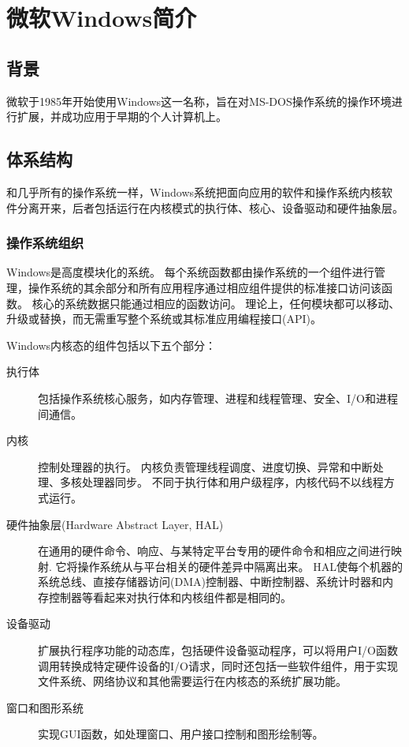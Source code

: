 
\section{微软Windows简介}
{
    \subsection{背景}
    {
        微软于1985年开始使用Windows这一名称，旨在对MS-DOS操作系统的操作环境进行扩展，并成功应用于早期的个人计算机上。
    }

    \subsection{体系结构}
    {
        和几乎所有的操作系统一样，Windows系统把面向应用的软件和操作系统内核软件分离开来，后者包括运行在内核模式的执行体、核心、设备驱动和硬件抽象层。

        \subsubsection{操作系统组织}
        {
            Windows是高度模块化的系统。
            每个系统函数都由操作系统的一个组件进行管理，操作系统的其余部分和所有应用程序通过相应组件提供的标准接口访问该函数。
            核心的系统数据只能通过相应的函数访问。
            理论上，任何模块都可以移动、升级或替换，而无需重写整个系统或其标准应用编程接口(API)。

            Windows内核态的组件包括以下五个部分：

            \begin{description}
                \item[执行体] 包括操作系统核心服务，如内存管理、进程和线程管理、安全、I/O和进程间通信。
                \item[内核]
                {
                    控制处理器的执行。
                    内核负责管理线程调度、进度切换、异常和中断处理、多核处理器同步。
                    不同于执行体和用户级程序，内核代码不以线程方式运行。
                }
                \item[硬件抽象层(Hardware Abstract Layer, HAL)]
                {
                    在通用的硬件命令、响应、与某特定平台专用的硬件命令和相应之间进行映射.
                    它将操作系统从与平台相关的硬件差异中隔离出来。
                    HAL使每个机器的系统总线、直接存储器访问(DMA)控制器、中断控制器、系统计时器和内存控制器等看起来对执行体和内核组件都是相同的。
                }
                \item[设备驱动]
                {
                    扩展执行程序功能的动态库，包括硬件设备驱动程序，可以将用户I/O函数调用转换成特定硬件设备的I/O请求，同时还包括一些软件组件，用于实现文件系统、网络协议和其他需要运行在内核态的系统扩展功能。
                }
                \item[窗口和图形系统] 实现GUI函数，如处理窗口、用户接口控制和图形绘制等。
            \end{description}
        }
    }
}
